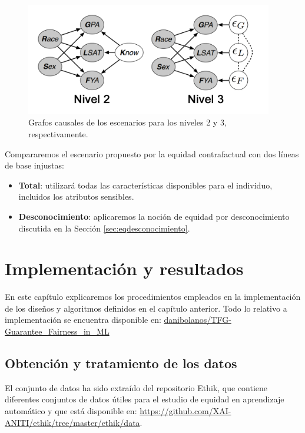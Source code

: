\documentclass[oneside,openright,titlepage,numbers=noenddot,openany,headinclude,footinclude=true,
cleardoublepage=empty,abstractoff,BCOR=5mm,paper=a4,fontsize=12pt,main=spanish]{scrreprt}
\begin{document}
\begin{figure}[h]
	\centering
	\includegraphics[width=10.8cm]{causales_pract.png}
	\caption{Grafos causales de los escenarios para los niveles 2 y 3, respectivamente.}
    \label{fig:practicausales}
\end{figure}

Compararemos el escenario propuesto por la equidad contrafactual con dos líneas de base injustas: 

\begin{itemize}
    \item \textbf{Total}: utilizará todas las características disponibles para el individuo, incluidos los atributos sensibles.
    \item \textbf{Desconocimiento}: aplicaremos la noción de equidad por desconocimiento discutida en la Sección \ref{sec:eqdesconocimiento}.
\end{itemize} 

\chapter{Implementación y resultados}

En este capítulo explicaremos los procedimientos empleados en la implementación de los diseños y algoritmos definidos en el capítulo anterior. Todo lo relativo a implementación se encuentra disponible en: \href{https://github.com/danibolanos/TFG-Guarantee_Fairness_in_ML.git}{danibolanos/TFG-Guarantee\_Fairness\_in\_ML}

\section{Obtención y tratamiento de los datos}

El conjunto de datos ha sido extraído del repositorio Ethik, que contiene diferentes conjuntos de datos útiles para el estudio de equidad en aprendizaje automático y que está disponible en: \url{https://github.com/XAI-ANITI/ethik/tree/master/ethik/data}.
\end{document}
